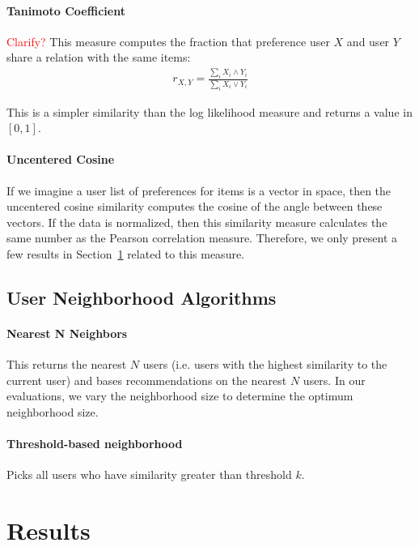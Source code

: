 \documentclass{article}
\begin{document}
\paragraph{Tanimoto Coefficient}

\textcolor{red}{Clarify?} This measure computes the
fraction that preference user $X$ and user $Y$ share a relation with the same items:\begin{align*}
r_{X, Y} = \frac{\sum_i X_i \wedge Y_i}{\sum_i X_i \vee Y_i}
\end{align*}

This is a simpler similarity than the log likelihood measure and returns a value in $[0, 1]$. 

\paragraph{Uncentered Cosine}

If we imagine a user list of preferences for items is a vector in space, then the uncentered cosine similarity computes
the cosine of the angle between these vectors. If the data is normalized, then this similarity measure calculates the
same number as the Pearson correlation measure. Therefore, we only present a few results in Section~\ref{sec:results} related to this measure.

\subsection{User Neighborhood Algorithms}

\paragraph{Nearest N Neighbors} This returns the nearest $N$ users (i.e. users with the highest similarity to the current
user) and bases recommendations on the nearest $N$ users. In our evaluations, we vary the neighborhood size to 
determine the optimum neighborhood size. 

\paragraph{Threshold-based neighborhood} Picks all users who have similarity greater than threshold $k$. 

\section{Results}\label{sec:results}
\end{document}
